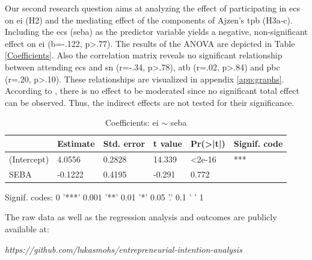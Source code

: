 Our second research question aims at analyzing the effect of participating in \acp{ec} on \ac{ei} (H2) and the mediating effect of the components of Ajzen's \ac{tpb} (H3a-c). Including the \acp{ec} (\ac{seba}) as the predictor variable yields a negative, non-significant effect on \ac{ei} (b=-.122, p>.77). The results of the ANOVA are depicted in Table \ref{Coefficients}. Also the correlation matrix reveals no significant relationship between attending \acp{ec} and \ac{sn} (r=-.34, p>.78), \ac{atb} (r=.02, p>.84) and \ac{pbc} (r=.20, p>.10). These relationships are visualized in appendix \ref{app:graphs}. According to \citet{baron1986moderator}, there is no effect to be moderated since no significant total effect can be observed. Thus, the indirect effects are not tested for their significance. 

\begin{table}[H]
\centering
\caption{Coefficients: \ac{ei} $\sim $ \ac{seba}}
\label{Coefficients-SEBA-EI}
\begin{tabular}{@{}llllll@{}}
\toprule
            & Estimate & Std. error & t value & Pr(\textgreater|t|) & Signif. code \\ \midrule
(Intercept) &  4.0556 & 0.2828    & 14.339   & <2e-16             & ***            \\
SEBA         &  -0.1222  &  0.4195    & -0.291   & 0.772                 &            \\ \bottomrule
\end{tabular}
\end{table}
\begin{center}
\begin{footnotesize}
Signif. codes:  0 '***' 0.001 '**' 0.01 '*' 0.05 '.' 0.1 ' ' 1
\end{footnotesize}
\end{center}

The raw data as well as the regression analysis and outcomes are publicly available at: 

\begin{center}
\textit{https://github.com/lukasmohs/entrepreneurial-intention-analysis}
\end{center} 

